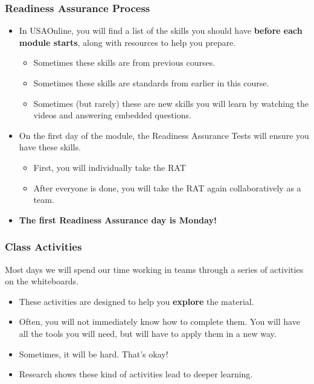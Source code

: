 \documentclass[aspectration=1610]{beamer}
\begin{document}
  \begin{frame}\frametitle{Readiness Assurance Process}
  \begin{itemize}
  \item In USAOnline, you will find a list of the skills you should have {\bf before each module starts}, along with resources to help you prepare.
  \begin{itemize}
  \item Sometimes these skills are from previous courses.
  \item Sometimes these skills are standards from earlier in this course.
    \item Sometimes (but rarely) these are new skills you will learn by watching the videos and answering embedded questions.
  \end{itemize}
  \pause \item On the first day of the module, the Readiness Assurance Tests will ensure you have these skills.
  \begin{itemize}
  \item First, you will individually take the RAT
  \item After everyone is done, you will take the RAT again collaboratively as a team.
  \end{itemize}
  \item {\bf The first Readiness Assurance day is Monday!}
  \end{itemize}
  \end{frame}
  
  
\begin{frame}\frametitle{Class Activities}
Most days we will spend our time working in teams through a series of activities on the whiteboards.
\begin{itemize}
\item These activities are designed to help you \textbf{explore} the material.
\item Often, you will not immediately know how to complete them.  You will have all the tools you will need, but will have to apply them in a new way.
\item Sometimes, it will be hard.  That's okay!
\item Research shows these kind of activities lead to deeper learning.
\end{itemize}

\end{frame}
  
\end{document}

